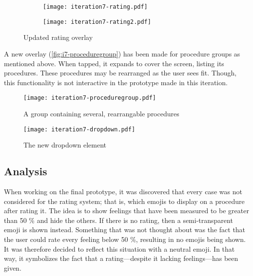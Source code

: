 \begin{figure}
    \centering
    \begin{subfigure}[t]{0.45\textwidth}
        \centering
        \vspace{0pt}
        \texttt{[image: iteration7-rating.pdf]}
        \label{fig:i7-rating-1}
    \end{subfigure}
    \begin{subfigure}[t]{0.45\textwidth}
        \centering
        \vspace{0pt}
        \texttt{[image: iteration7-rating2.pdf]}
        \label{fig:i7-rating-2}
    \end{subfigure}
    \caption{Updated rating overlay}
    \label{fig:i7-rating}
\end{figure}

A new overlay (\autoref{fig:i7-proceduregroup}) has been made for procedure groups as mentioned above. When tapped, it expands to cover the screen, listing its procedures. These procedures may be rearranged as the user sees fit. Though, this functionality is not interactive in the prototype made in this iteration.

\begin{figure}
    \centering
    \texttt{[image: iteration7-proceduregroup.pdf]}
    \caption{A group containing several, rearrangable procedures}
    \label{fig:i7-proceduregroup}
\end{figure}

\begin{figure}
    \centering
    \texttt{[image: iteration7-dropdown.pdf]}
    \caption{The new dropdown element}
    \label{fig:i7-dropdown}
\end{figure}

\subsection{Analysis}

When working on the final prototype, it was discovered that every case was not considered for the rating system; that is, which emojis to display on a procedure after rating it. The idea is to show feelings that have been measured to be greater than 50 \% and hide the others. If there is no rating, then a semi-transparent emoji is shown instead. Something that was not thought about was the fact that the user could rate every feeling below 50 \%, resulting in no emojis being shown. It was therefore decided to reflect this situation with a neutral emoji. In that way, it symbolizes the fact that a rating---despite it lacking feelings---has been given.

